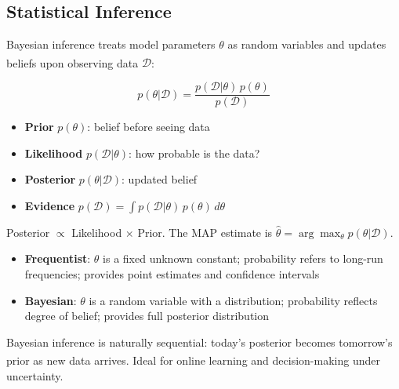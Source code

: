     \subsection{Statistical Inference}
    \begin{tcbitemize}[ skin=sectionraster ]

    \tcbitem[title=Bayesian Inference, raster multicolumn=3]
    Bayesian inference treats model parameters $\theta$ as random variables
    and updates beliefs upon observing data
    $\mathcal{D}$:\textsuperscript{\cite[][pp.~14--19]{barberBayesianReasoningMachine2012}}

    \begin{equation}
        p(\theta|\mathcal{D}) = \frac{p(\mathcal{D}|\theta)\,p(\theta)}{p(\mathcal{D})}
    \end{equation}

    \begin{itemize}
        \item \textbf{Prior} $p(\theta)$: belief before seeing data
        \item \textbf{Likelihood} $p(\mathcal{D}|\theta)$: how probable is the data?
        \item \textbf{Posterior} $p(\theta|\mathcal{D})$: updated belief
        \item \textbf{Evidence} $p(\mathcal{D}) = \int p(\mathcal{D}|\theta)\,p(\theta)\,d\theta$
    \end{itemize}

    Posterior $\propto$ Likelihood $\times$ Prior.
    The MAP estimate is $\hat{\theta} = \arg\max_\theta p(\theta|\mathcal{D})$.

    \tcbitem[title={Bayesian vs Frequentist}, raster multicolumn=3]
    \begin{itemize}
        \item \textbf{Frequentist}: $\theta$ is a fixed unknown constant;
              probability refers to long-run frequencies; provides point
              estimates and confidence intervals
        \item \textbf{Bayesian}: $\theta$ is a random variable with a
              distribution; probability reflects degree of belief; provides
              full posterior distribution
    \end{itemize}

    Bayesian inference is naturally sequential: today’s posterior becomes
    tomorrow’s prior as new data
    arrives.\textsuperscript{\cite[][Ch.~1]{downeyThinkBayes2016}}
    Ideal for online learning and decision-making under uncertainty.


\end{tcbitemize}
